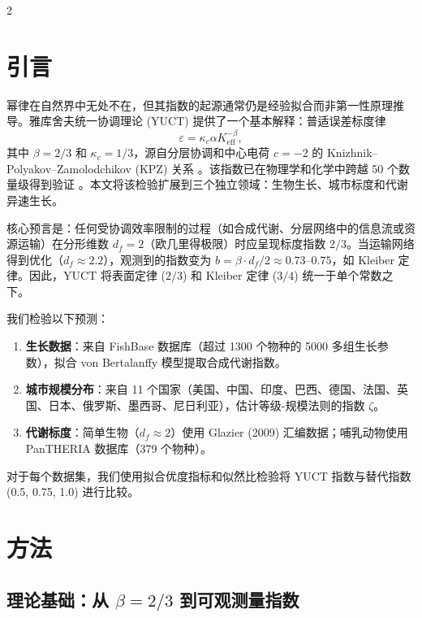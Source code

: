\documentclass[11pt,a4paper]{article}
\newcommand{\eps}{\varepsilon}
\newcommand{\kappac}{\kappa_c}
\newcommand{\Keff}{K_{\mathrm{eff}}}
\newcommand{\betaf}{\beta}
\newcommand{\df}{d_f}
\begin{document}
	\vspace{0.4cm}
	\vspace*{-\baselineskip}
	\begin{multicols}{2}
		
		\section{引言}
		
		幂律在自然界中无处不在，但其指数的起源通常仍是经验拟合而非第一性原理推导。雅库舍夫统一协调理论 (YUCT) 提供了一个基本解释：普适误差标度律
		\[
		\eps = \kappac \alpha \Keff^{-\betaf},
		\]
		其中 \(\betaf = 2/3\) 和 \(\kappac = 1/3\)，源自分层协调和中心电荷 \(c = -2\) 的 Knizhnik–Polyakov–Zamolodchikov (KPZ) 关系 \cite{AppendixY, AppendixL}。该指数已在物理学和化学中跨越 50 个数量级得到验证 \cite{AppendixC, AppendixG}。本文将该检验扩展到三个独立领域：生物生长、城市标度和代谢异速生长。
		
		核心预言是：任何受协调效率限制的过程（如合成代谢、分层网络中的信息流或资源运输）在分形维数 \(\df = 2\)（欧几里得极限）时应呈现标度指数 \(2/3\)。当运输网络得到优化（\(\df \approx 2.2\)），观测到的指数变为 \(b = \betaf \cdot \df/2 \approx 0.73\)–\(0.75\)，如 Kleiber 定律。因此，YUCT 将表面定律 (\(2/3\)) 和 Kleiber 定律 (\(3/4\)) 统一于单个常数之下。
		
		我们检验以下预测：
		\begin{enumerate}
			\item \textbf{生长数据}：来自 FishBase 数据库（超过 1300 个物种的 5000 多组生长参数），拟合 von Bertalanffy 模型提取合成代谢指数。
			\item \textbf{城市规模分布}：来自 11 个国家（美国、中国、印度、巴西、德国、法国、英国、日本、俄罗斯、墨西哥、尼日利亚），估计等级-规模法则的指数 \(\zeta\)。
			\item \textbf{代谢标度}：简单生物（\(\df \approx 2\)）使用 Glazier (2009) 汇编数据；哺乳动物使用 PanTHERIA 数据库（379 个物种）。
		\end{enumerate}
		对于每个数据集，我们使用拟合优度指标和似然比检验将 YUCT 指数与替代指数 (0.5, 0.75, 1.0) 进行比较。
		
		\section{方法}
		
		\subsection{理论基础：从 \(\beta = 2/3\) 到可观测量指数}
		

\end{multicols}
\end{document}
